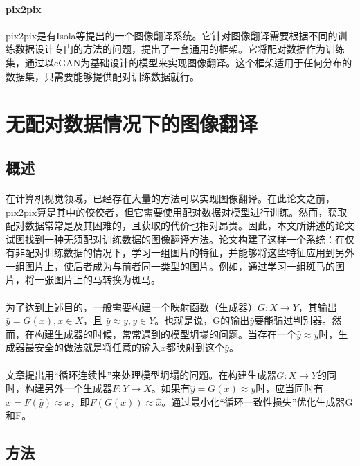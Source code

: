 \documentclass[12pt,a4paper]{article}
\begin{document}
\paragraph{pix2pix} pix2pix是有Isola等\cite{pix2pix}提出的一个图像翻译系统。它针对图像翻译需要根据不同的训练数据设计专门的方法的问题，提出了一套通用的框架。它将配对数据作为训练集，通过以cGAN为基础设计的模型来实现图像翻译。这个框架适用于任何分布的数据集，只需要能够提供配对训练数据就行。

\section{无配对数据情况下的图像翻译}
\subsection{概述}
\paragraph{} 在计算机视觉领域，已经存在大量的方法可以实现图像翻译。在此论文之前，pix2pix算是其中的佼佼者，但它需要使用配对数据对模型进行训练。然而，获取配对数据常常是及其困难的，且获取的代价也相对昂贵。因此，本文所讲述的论文试图找到一种无须配对训练数据的图像翻译方法。论文构建了这样一个系统：在仅有非配对训练数据的情况下，学习一组图片的特征，并能够将这些特征应用到另外一组图片上，使后者成为与前者同一类型的图片。例如，通过学习一组斑马的图片，将一张图片上的马转换为斑马。
\paragraph{} 为了达到上述目的，一般需要构建一个映射函数（生成器）$G: X \rightarrow Y$，其输出$ \hat y = G(x), x \in X $，且 $\hat y \approx y, y \in Y$。也就是说，G的输出$\hat y$要能骗过判别器。然而，在构建生成器的时候，常常遇到的模型坍塌的问题。当存在一个$\hat y \approx y$时，生成器最安全的做法就是将任意的输入$x$都映射到这个$\hat y$。
\paragraph{} 文章提出用“循环连续性”来处理模型坍塌的问题。在构建生成器$G: X \rightarrow Y$的同时，构建另外一个生成器$F: Y \rightarrow X$。如果有$\hat y = G(x) \approx y$时，应当同时有 $\hat x = F(\hat y) \approx x$，即$F(G(x)) \approx \hat x$。通过最小化“循环一致性损失”优化生成器G和F。

\subsection{方法}
\end{document}

